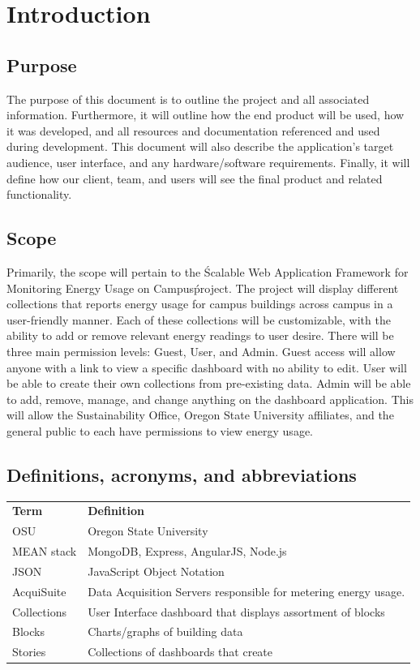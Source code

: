 \documentclass[onecolumn, draftclsnofoot,10pt, compsoc]{IEEEtran}
\begin{document}
    \section{Introduction}
    \subsection{Purpose}
	The purpose of this document is to outline the project and all associated information. Furthermore, it will outline how the end product will be used, how it was developed, and all resources and documentation referenced and used during development. This document will also describe the application’s target audience, user interface, and any hardware/software requirements. Finally, it will define how our client, team, and users will see the final product and related functionality.
    \subsection{Scope}
	Primarily, the scope will pertain to the \'Scalable Web Application Framework for Monitoring Energy Usage on Campus\' project. The project will display different collections that reports energy usage for campus buildings across campus in a user-friendly manner. Each of these collections will be customizable, with the ability to add or remove relevant energy readings to user desire. There will be three main permission levels: Guest, User, and Admin. Guest access will allow anyone with a link to view a specific dashboard with no ability to edit. User will be able to create their own collections from pre-existing data. Admin will be able to add, remove, manage, and change anything on the dashboard application. This will allow the Sustainability Office, Oregon State University affiliates, and the general public to each have permissions to view energy usage.
    \subsection{Definitions, acronyms, and abbreviations} \label{definition}
	\begin{table}[h]
	\centering
	
	\begin{tabular}{ll}
	\textbf{Term} & \textbf{Definition} \\
	OSU & Oregon State University \\
	MEAN stack & MongoDB, Express, AngularJS, Node.js \\
	JSON & JavaScript Object Notation \\
	AcquiSuite & Data Acquisition Servers responsible for metering energy usage. \\
	Collections & User Interface dashboard that displays assortment of blocks \\
    Blocks & Charts/graphs of building data \\
    Stories & Collections of dashboards that create
	\end{tabular}
	\end{table}
\end{document}
